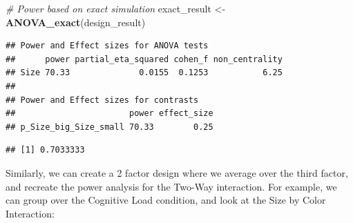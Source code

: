 \documentclass[]{book}
\newenvironment{Shaded}{\begin{snugshade}}{\end{snugshade}}
\newcommand{\CommentTok}[1]{\textcolor[rgb]{0.56,0.35,0.01}{\textit{#1}}}
\newcommand{\KeywordTok}[1]{\textcolor[rgb]{0.13,0.29,0.53}{\textbf{#1}}}
\newcommand{\NormalTok}[1]{#1}
\newcommand{\OperatorTok}[1]{\textcolor[rgb]{0.81,0.36,0.00}{\textbf{#1}}}
\newcommand{\StringTok}[1]{\textcolor[rgb]{0.31,0.60,0.02}{#1}}
\begin{document}
\begin{Shaded}
\begin{Highlighting}[]
\CommentTok{# Power based on exact simulation}
\NormalTok{exact_result <-}\StringTok{ }\KeywordTok{ANOVA_exact}\NormalTok{(design_result)}
\end{Highlighting}
\end{Shaded}

\begin{verbatim}
## Power and Effect sizes for ANOVA tests
##      power partial_eta_squared cohen_f non_centrality
## Size 70.33              0.0155  0.1253           6.25
## 
## Power and Effect sizes for contrasts
##                       power effect_size
## p_Size_big_Size_small 70.33        0.25
\end{verbatim}

\begin{Shaded}
\end{Shaded}

\begin{verbatim}
## [1] 0.7033333
\end{verbatim}

Similarly, we can create a 2 factor design where we average over the third factor, and recreate the power analysis for the Two-Way interaction. For example, we can group over the Cognitive Load condition, and look at the Size by Color Interaction:
\end{document}
